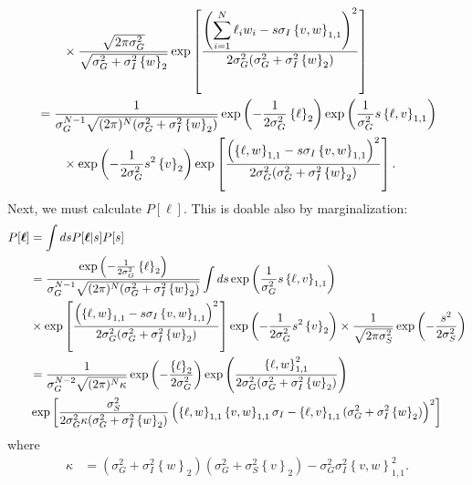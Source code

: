 \documentclass[11pt]{article}
\begin{document}
\begin{align}
	&\qquad \times \frac{\sqrt{2\pi \sigma_G^2}}{\sqrt{\sigma_G^2 + \sigma_I^2 \left\{w\right\}_2}}\exp\left[\frac{\left(\displaystyle\sum_{i=1}^N \ell_i w_i - s \sigma_I \left\{v,w\right\}_{1,1}\right)^2}{2 \sigma_G^2 (\sigma_G^2 + \sigma_I^2 \left\{w\right\}_2)}\right] \\
	&= \frac{1}{\sigma_G^{N-1}\sqrt{(2\pi)^N(\sigma_G^2 + \sigma_I^2 \left\{w\right\}_2)}}\exp\left(-\frac{1}{2\sigma_G^2}\left\{\ell \right\}_2\right)\exp\left(\frac{1}{\sigma_G^2} s\left\{\ell, v\right\}_{1,1}\right) \notag \\
	&\qquad \times \exp\left(-\frac{1}{2\sigma_G^2}s^2 \left\{v\right\}_2\right)\exp\left[\frac{\left(\left\{\ell, w\right\}_{1,1} - s \sigma_I \left\{v,w\right\}_{1,1}\right)^2}{2\sigma_G^2 (\sigma_G^2 + \sigma_I^2 \left\{w\right\}_2)}\right].
\end{align}
Next, we must calculate $P[\boldsymbol{\ell}]$. This is doable also by marginalization:
\begin{align}
	P[\boldsymbol{\ell}] &= \int ds P[\boldsymbol{\ell}|s] P[s] \\
	&= \frac{\exp\left(-\frac{1}{2\sigma_G^2}\left\{\ell \right\}_2\right)}{\sigma_G^{N-1}\sqrt{(2\pi)^N(\sigma_G^2 + \sigma_I^2 \left\{w\right\}_2)}} \int ds \exp\left(\frac{1}{\sigma_G^2} s\left\{\ell, v\right\}_{1,1}\right) \\
	&\times \exp\left[\frac{\left(\left\{\ell, w\right\}_{1,1} - s \sigma_I \left\{v,w\right\}_{1,1}\right)^2}{2\sigma_G^2 (\sigma_G^2 + \sigma_I^2 \left\{w\right\}_2)}\right]\exp\left(-\frac{1}{2\sigma_G^2}s^2 \left\{v\right\}_2\right)\times \frac{1}{\sqrt{2\pi \sigma_S^2}} \exp\left(-\frac{s^2}{2\sigma_S^2}\right) \\
	&= \frac{1}{\sigma_G^{N-2}\sqrt{(2\pi)^N \kappa}} \exp\left(-\frac{\left\{\ell \right\}_2}{2\sigma_G^2}\right)\exp\left(\frac{\left\{\ell,w\right\}_{1,1}^2}{2 \sigma_G^2(\sigma_G^2 + \sigma_I^2 \left\{w\right\}_2) }\right)    \notag \\
	&\exp\left[\frac{\sigma_S^2}{2\sigma_G^2 \kappa (\sigma_G^2 + \sigma_I^2 \left\{w\right\}_2)} \left(\left\{\ell,w\right\}_{1,1} \left\{v,w\right\}_{1,1} \sigma_I - \left\{\ell, v\right\}_{1,1} (\sigma_G^2 +\sigma_I^2 \left\{w\right\}_2)\right)^2\right]
\end{align}
where 
\begin{align}
	\kappa &= \left(\sigma_G^2 + \sigma_I^2 \left\{w\right\}_2\right)\left(\sigma_G^2 + \sigma_S^2 \left\{v\right\}_2\right) - \sigma_G^2 \sigma_I^2 \left\{v,w\right\}_{1,1}^2.
\end{align}
\end{document}
